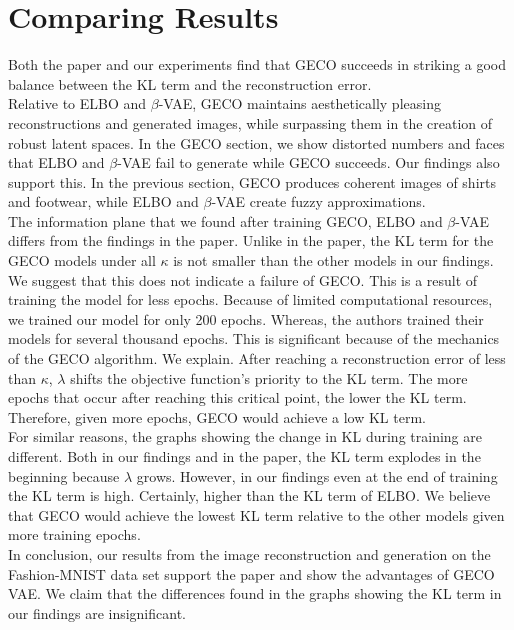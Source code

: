 \chapter*{Comparing Results}
Both the paper and our experiments find that GECO succeeds in striking a good balance between the KL term and the reconstruction error.\\
Relative to ELBO and $\beta$-VAE, GECO maintains aesthetically pleasing reconstructions and generated images, while surpassing them in the creation of robust latent spaces. In the GECO section, we show distorted numbers and faces that ELBO and $\beta$-VAE fail to generate while GECO succeeds. Our findings also support this. In the previous section, GECO produces coherent images of shirts and footwear, while ELBO and $\beta$-VAE create fuzzy approximations.\\
The information plane that we found after training GECO, ELBO and $\beta$-VAE differs from the findings in the paper. Unlike in the paper, the KL term for the GECO models under all $\kappa$ is not smaller than the other models in our findings. We suggest that this does not indicate a failure of GECO. This is a result of training the model for less epochs. Because of limited computational resources, we trained our model for only 200 epochs. Whereas, the authors trained their models for several thousand epochs. This is significant because of the mechanics of the GECO algorithm. We explain. After reaching a reconstruction error of less than $\kappa$, $\lambda$ shifts the objective function's priority to the KL term. The more epochs that occur after reaching this critical point, the lower the KL term. Therefore, given more epochs, GECO would achieve a low KL term.\\
For similar reasons, the graphs showing the change in KL during training are different. Both in our findings and in the paper, the KL term explodes in the beginning because $\lambda$ grows. However, in our findings even at the end of training the KL term is high. Certainly, higher than the KL term of ELBO. We believe that GECO would achieve the lowest KL term relative to the other models given more training epochs.\\
In conclusion, our results from the image reconstruction and generation on the Fashion-MNIST data set support the paper and show the advantages of GECO VAE. We claim that the differences found in the graphs showing the KL term in our findings are insignificant.\\
